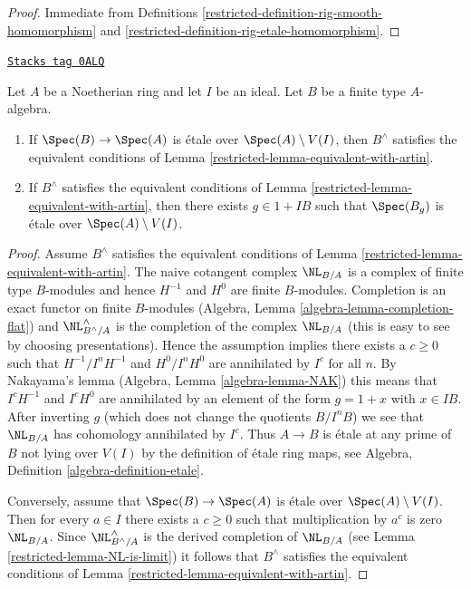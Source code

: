 \begin{proof}

Immediate from Definitions \ref{restricted-definition-rig-smooth-homomorphism} and
\ref{restricted-definition-rig-etale-homomorphism}.
\end{proof}

\begin{lemma}
\label{restricted-lemma-rig-etale}
\href{https://stacks.math.columbia.edu/tag/0ALQ}{\texttt{Stacks tag 0ALQ}}

Let $A$ be a Noetherian ring and let $I$ be an ideal.
Let $B$ be a finite type $A$-algebra.
\begin{enumerate}
\item If $\Spec(B) \to \Spec(A)$ is \'etale over $\Spec(A) \setminus V(I)$,
then $B^\wedge$ satisfies the equivalent conditions of
Lemma \ref{restricted-lemma-equivalent-with-artin}.
\item If $B^\wedge$ satisfies the equivalent conditions of
Lemma \ref{restricted-lemma-equivalent-with-artin},
then there exists $g \in 1 + IB$ such that $\Spec(B_g)$ is \'etale
over $\Spec(A) \setminus V(I)$.
\end{enumerate}
\end{lemma}

\begin{proof}

Assume $B^\wedge$ satisfies the equivalent conditions of
Lemma \ref{restricted-lemma-equivalent-with-artin}.
The naive cotangent complex $\NL_{B/A}$ is a complex of finite type
$B$-modules and hence $H^{-1}$ and $H^0$ are finite $B$-modules.
Completion is an exact functor on finite $B$-modules (Algebra,
Lemma \ref{algebra-lemma-completion-flat}) and $\NL_{B^\wedge/A}^\wedge$
is the completion of the complex $\NL_{B/A}$ (this is easy to see
by choosing presentations).
Hence the assumption implies there exists a $c \geq 0$ such that
$H^{-1}/I^nH^{-1}$ and $H^0/I^nH^0$ are annihilated by $I^c$
for all $n$. By Nakayama's lemma (Algebra, Lemma \ref{algebra-lemma-NAK})
this means that $I^cH^{-1}$ and $I^cH^0$ are annihilated by an element
of the form $g = 1 + x$ with $x \in IB$. After inverting $g$
(which does not change the quotients $B/I^nB$)
we see that $\NL_{B/A}$ has cohomology annihilated by $I^c$. Thus
$A \to B$ is \'etale at any prime of $B$ not lying over $V(I)$
by the definition of \'etale ring maps, see
Algebra, Definition \ref{algebra-definition-etale}.

\medskip\noindent
Conversely, assume that $\Spec(B) \to \Spec(A)$ is \'etale over
$\Spec(A) \setminus V(I)$. Then for every $a \in I$ there exists
a $c \geq 0$ such that multiplication by $a^c$ is zero $\NL_{B/A}$.
Since $\NL_{B^\wedge/A}^\wedge$ is the derived completion of
$\NL_{B/A}$ (see Lemma \ref{restricted-lemma-NL-is-limit}) it follows that
$B^\wedge$ satisfies the equivalent conditions of
Lemma \ref{restricted-lemma-equivalent-with-artin}.
\end{proof}

